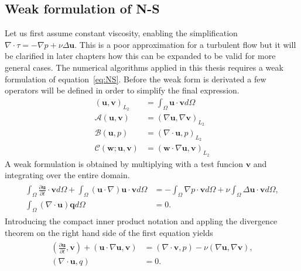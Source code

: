 \subsection{Weak formulation of N-S}
Let us first assume constant viscosity, enabling the simplification $\nabla \cdot \tau = -\nabla p + \nu \Delta \mathbf{u}$.
This is a poor approximation for a turbulent flow but it will be clarified in later chapters how this can be expanded
to be valid for more general cases.
The numerical algorithms applied in this thesis requires a weak formulation of equation~\ref{eq:NS}.
Before the weak form is derivated a few operators will be defined in order to simplify the final 
expression.
%
\begin{align}
    ( \mathbf{u},\mathbf{v})_{L_2} &= \int_{\Omega}\mathbf{u} \cdot \mathbf{v} d\Omega\\
    \mathcal{A}(\mathbf{u},\mathbf{v}) &= (\nabla \mathbf{u},\nabla \mathbf{v})_{L_2}\\
    \mathcal{B}(\mathbf{u},p) &= (\nabla \cdot \mathbf{u},p)_{L_2}\\
    \mathcal{C}(\mathbf{w};\mathbf{u},\mathbf{v}) &= (\mathbf{w}\cdot \nabla \mathbf{u},\mathbf{v})_{L_2}
    \label{eq:weakoperators}
\end{align}
%
A weak formulation is obtained by multiplying with a test funcion $\mathbf{v}$ and integrating over
the entire domain.
\begin{align}
    \begin{split}
        \int_{\Omega}\frac{\partial \mathbf{u}}{\partial t}\cdot\mathbf{v}d\Omega
        + \int_{\Omega}(\mathbf{u}\cdot \nabla)\mathbf{u}\cdot\mathbf{v}d\Omega
        &= -\int_{\Omega}\nabla p\cdot \mathbf{v} d\Omega 
        + \nu \int_{\Omega}\Delta\mathbf{u}\cdot\mathbf{v}d\Omega, \\
		\int_{\Omega}(\nabla \cdot \mathbf{u}) \mathbf{q}d\Omega &= 0.
    \end{split}
	\label{eq:NSweak1}
\end{align}
Introducing the compact inner product notation and appling the divergence theorem on the right hand side of 
the first equation yields
\begin{align}
    \begin{split}
        (\frac{\partial \mathbf{u}}{\partial t},\mathbf{v})
        + (\mathbf{u}\cdot \nabla\mathbf{u},\mathbf{v})
        &= (\nabla \cdot \mathbf{v} , p ) 
        -\nu(\nabla \mathbf{u},\nabla \mathbf{v}), \\
		(\nabla \cdot \mathbf{u},q) &= 0.
    \end{split}
	\label{eq:NSweak}
\end{align}
